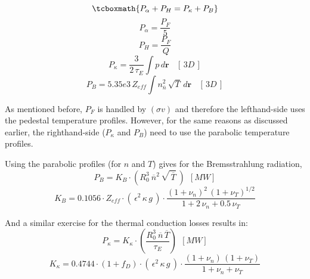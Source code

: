 \label{pwr_bal}
\begin{equation}
\tcboxmath{
P_\alpha + P_H = P_\kappa + P_B }
\end{equation}
\begin{equation}
	P_\alpha = \frac{P_F}{5}
\end{equation}
\begin{equation}
	P_H = \frac{P_F}{Q}
\end{equation}
\begin{equation}
	P_\kappa = \frac{3}{2 \, \tau_E} \int p \, d\textbf{r} \ \ \ \ [ \, 3D \, ]
\end{equation}
\begin{equation}
	P_B = 5.35e3 \, Z_{eff} \int n_{\overline{n}}^2 \, \sqrt{T} \, d\textbf{r} \ \ \ \ [ \, 3D \, ]
\end{equation}

As mentioned before, $P_F$ is handled by $(\sigma v)$ and therefore the lefthand-side uses the pedestal temperature profiles. However, for the same reasons as discussed earlier, the righthand-side ($P_\kappa$ and $P_B$) need to use the parabolic temperature profiles.

Using the parabolic profiles (for $n$ and $T$) gives for the Bremsstrahlung radiation,
\begin{equation}
	P_B = K_B \cdot \left( R_0^3 \ \overline{n}^2 \, \sqrt{\,\overline{T}} \ \right) \ \ [MW]
\end{equation}
\begin{equation}
	K_B = 0.1056 \cdot Z_{eff} \cdot ( \, \epsilon^2 \, \kappa \, g \, ) \cdot \frac{ (1+\nu_n)^2 \, (1+\nu_T)^{1/2} }{1+2 \, \nu_n + 0.5 \, \nu_T}
\end{equation}

And a similar exercise for the thermal conduction losses results in:
\begin{equation}
	P_\kappa = K_\kappa \cdot \left( \frac{ R_0 ^ 3 \ \overline{n}  \, \overline{T} }{\tau_E} \right) \ \ [MW]
\end{equation}
\begin{equation}
	K_\kappa = 0.4744 \cdot  ( 1 + f_D ) \cdot ( \, \epsilon^2 \, \kappa \, g \, ) \cdot \frac{ (1 + \nu_n) \, (1 + \nu_T) }{1 + \nu_n + \nu_T }
\end{equation}

\clearpage
\newpage





